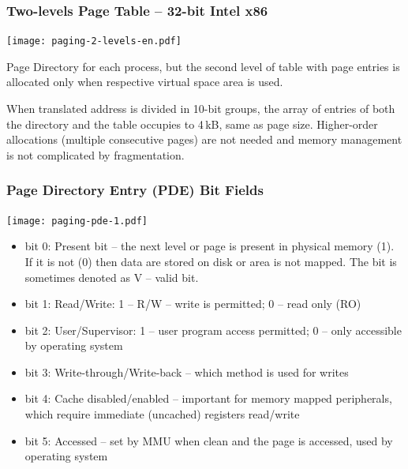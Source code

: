 \documentclass{beamer}
\begin{document}
\begin{frame}
\frametitle{Two-levels Page Table -- 32-bit Intel x86}

{
\centering

\texttt{[image: paging-2-levels-en.pdf]}

}

Page Directory for each process, but the second level of table with page entries is allocated only when respective virtual space area is used.

\smallskip

When translated address is divided in 10-bit groups, the array of entries
of both the directory and the table occupies to 4\,kB, same as page size. Higher-order allocations
(multiple consecutive pages) are not needed and memory management is not complicated by fragmentation.

\end{frame}

\begin{frame}
\frametitle{\textbf{Page Directory Entry} (PDE) Bit Fields}

{
\centering

\texttt{[image: paging-pde-1.pdf]}

}

\vskip 2mm

\begin{itemize}
\item bit 0: Present bit -- the next level or page is present in physical memory (1). If it is not (0) then data are stored on disk or area is not mapped. The bit is sometimes denoted as V -- valid bit.
\item bit 1: Read/Write: 1 -- R/W -- write is permitted; 0 -- read only (RO)
\item bit 2: User/Supervisor: 1 -- user program access permitted; 0 -- only accessible by operating system
\item bit 3: Write-through/Write-back -- which method is used for writes
\item bit 4: Cache disabled/enabled -- important for memory mapped peripherals, which require immediate (uncached) registers read/write 
\item bit 5: Accessed -- set by MMU when clean and the page is accessed, used by operating system
\end{itemize}

\end{frame}
\end{document}
